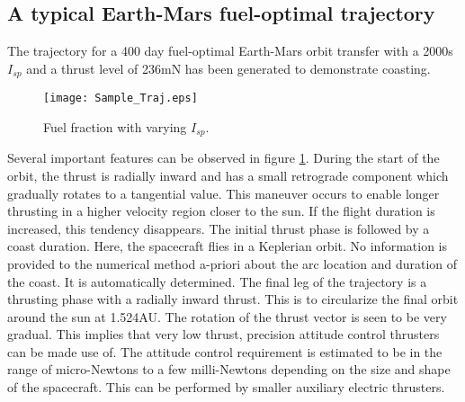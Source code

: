 \subsection{A typical Earth-Mars fuel-optimal trajectory}
The trajectory for a 400 day fuel-optimal Earth-Mars orbit transfer with a 2000s $I_{sp}$ and a thrust level of 236mN has been generated to demonstrate coasting.
\begin{figure}[H]
	\centering\texttt{[image: Sample\_Traj.eps]}
	\caption{Fuel fraction with varying $I_{sp}$.}
	\label{sampletraj_fuelopt}
\end{figure}
Several important features can be observed in figure \ref{sampletraj_fuelopt}. During the start of the orbit, the thrust is radially inward and has a small retrograde component which gradually rotates to a tangential value. This maneuver occurs to enable longer thrusting in a higher velocity region closer to the sun. If the flight duration is increased, this tendency disappears. The initial thrust phase is followed by a coast duration. Here, the spacecraft flies in a Keplerian orbit. No information is provided to the numerical method a-priori about the arc location and duration of the coast. It is automatically determined. The final leg of the trajectory is a thrusting phase with a radially inward thrust. This is to circularize the final orbit around the sun at 1.524AU. The rotation of the thrust vector is seen to be very gradual. This implies that very low thrust, precision attitude control thrusters can be made use of. The attitude control requirement is estimated to be in the range of micro-Newtons to a few milli-Newtons depending on the size and shape of the spacecraft. This can be performed by smaller auxiliary electric thrusters.
